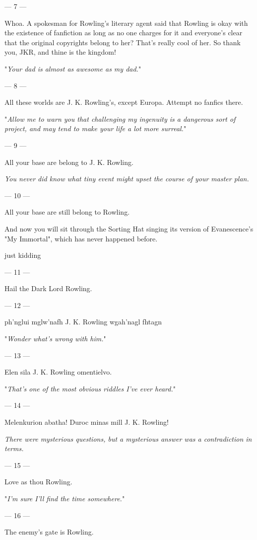 {--- 7 ---

Whoa. A spokesman
for Rowling's literary agent said that Rowling is okay with the existence of
fanfiction as long as no one charges for it and everyone's clear that the
original copyrights belong to her? That's really cool of her. So thank you,
JKR, and thine is the kingdom!

"\emph{Your dad is almost as awesome as my dad.}"

--- 8 ---

All these worlds
are J. K. Rowling's, except Europa. Attempt no fanfics there.

"\emph{Allow me to warn you that challenging my ingenuity is a dangerous sort
of project, and may tend to make your life a lot more surreal.}"

--- 9 ---

All your base are
belong to J. K. Rowling.

\emph{You never did know what tiny event might upset the course of your master
plan.}

--- 10 ---

All your base are
still belong to Rowling.

And now you will sit through the Sorting Hat singing its version of
Evanescence's "My Immortal", which has never happened before.

just kidding

--- 11 ---

Hail the Dark Lord Rowling.

--- 12 ---

ph'nglui mglw'nafh J. K. Rowling wgah'nagl fhtagn

"\emph{Wonder what's wrong with \emph{him}.}"

--- 13 ---

Elen sila J. K. Rowling omentielvo.

"\emph{That's one of the most obvious riddles I've ever heard.}"

--- 14 ---

Melenkurion abatha! Duroc minas mill J. K. Rowling!

\emph{There were mysterious questions, but a mysterious answer was a
contradiction in terms.}

--- 15 ---

Love as thou Rowling.

"\emph{I'm sure I'll find the time somewhere.}"

--- 16 ---

The enemy's gate is Rowling.

}
